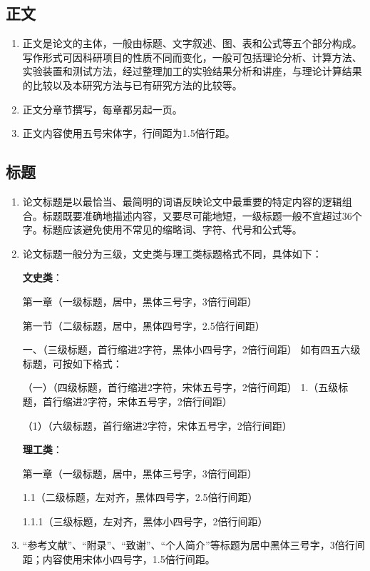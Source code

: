 \subsection{正文}

\begin{enumerate}[label=\arabic*)]
	\item 正文是论文的主体，一般由标题、文字叙述、图、表和公式等五个部分构成。写作形式可因科研项目的性质不同而变化，一般可包括理论分析、计算方法、实验装置和测试方法，经过整理加工的实验结果分析和讲座，与理论计算结果的比较以及本研究方法与已有研究方法的比较等。
	
	\item 正文分章节撰写，每章都另起一页。
	
	\item 正文内容使用五号宋体字，行间距为1.5倍行距。
	
\end{enumerate}

\subsection{标题}
\begin{enumerate}[label=\arabic*)]
	\item 论文标题是以最恰当、最简明的词语反映论文中最重要的特定内容的逻辑组合。标题既要准确地描述内容，又要尽可能地短，一级标题一般不宜超过36个字。标题应该避免使用不常见的缩略词、字符、代号和公式等。
	
	\item 论文标题一般分为三级，文史类与理工类标题格式不同，具体如下：
	
	{\bfseries 文史类}：
	
	第一章（一级标题，居中，黑体三号字，3倍行间距）
	
	第一节（二级标题，居中，黑体四号字，2.5倍行间距）
	
	一、（三级标题，首行缩进2字符，黑体小四号字，2倍行间距）
	如有四五六级标题，可按如下格式：
	
	（一）（四级标题，首行缩进2字符，宋体五号字，2倍行间距）
	1.（五级标题，首行缩进2字符，宋体五号字，2倍行间距）
	
	（1）（六级标题，首行缩进2字符，宋体五号字，2倍行间距）
	
	{\bfseries 理工类}：
	
	第一章（一级标题，居中，黑体三号字，3倍行间距）
	
	1.1（二级标题，左对齐，黑体四号字，2.5倍行间距）
	
	1.1.1（三级标题，左对齐，黑体小四号字，2倍行间距）
	
	\item “参考文献”、“附录”、“致谢”、“个人简介”等标题为居中黑体三号字，3倍行间距；内容使用宋体小四号字，1.5倍行间距。
	
\end{enumerate}

